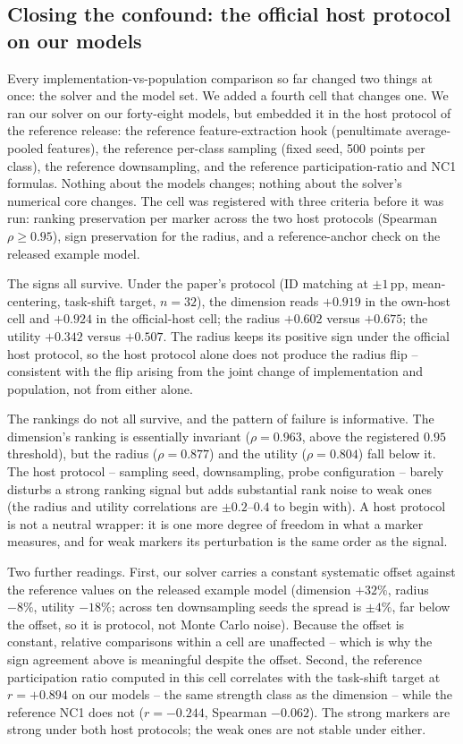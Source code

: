 \documentclass[10pt]{article}
\begin{document}
\subsection{Closing the confound: the official host protocol on our models}
\label{sec:cell4}

Every implementation-vs-population comparison so far changed two things at
once: the solver and the model set. We added a fourth cell that changes one.
We ran our solver on our forty-eight models, but embedded it in the host
protocol of the reference release: the reference feature-extraction hook
(penultimate average-pooled features), the reference per-class sampling
(fixed seed, 500 points per class), the reference downsampling, and the
reference participation-ratio and NC1 formulas. Nothing about the models
changes; nothing about the solver's numerical core changes. The cell was
registered with three criteria before it was run: ranking preservation per
marker across the two host protocols (Spearman $\rho \ge 0.95$), sign
preservation for the radius, and a reference-anchor check on the released
example model.

The signs all survive. Under the paper's protocol (ID matching at
$\pm1$\,pp, mean-centering, task-shift target, $n=32$), the dimension reads
$+0.919$ in the own-host cell and $+0.924$ in the official-host cell; the
radius $+0.602$ versus $+0.675$; the utility $+0.342$ versus $+0.507$. The
radius keeps its positive sign under the official host protocol, so the host
protocol alone does not produce the radius flip -- consistent with the flip
arising from the joint change of implementation and population, not from
either alone.

The rankings do not all survive, and the pattern of failure is informative.
The dimension's ranking is essentially invariant ($\rho = 0.963$, above the
registered $0.95$ threshold), but the radius ($\rho = 0.877$) and the
utility ($\rho = 0.804$) fall below it. The host protocol -- sampling seed,
downsampling, probe configuration -- barely disturbs a strong ranking signal
but adds substantial rank noise to weak ones (the radius and utility
correlations are $\pm 0.2$--$0.4$ to begin with). A host protocol is not a
neutral wrapper: it is one more degree of freedom in what a marker measures,
and for weak markers its perturbation is the same order as the signal.

Two further readings. First, our solver carries a constant systematic offset
against the reference values on the released example model (dimension
$+32\%$, radius $-8\%$, utility $-18\%$; across ten downsampling seeds the
spread is $\pm 4\%$, far below the offset, so it is protocol, not Monte
Carlo noise). Because the offset is constant, relative comparisons within a
cell are unaffected -- which is why the sign agreement above is meaningful
despite the offset. Second, the reference participation ratio computed in
this cell correlates with the task-shift target at $r = +0.894$ on our
models -- the same strength class as the dimension -- while the reference
NC1 does not ($r = -0.244$, Spearman $-0.062$). The strong markers are
strong under both host protocols; the weak ones are not stable under
either.
\end{document}
